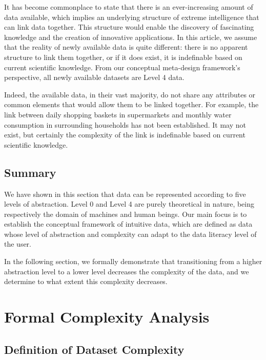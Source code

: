 \documentclass[Afour,times,sageh]{sagej}
\begin{document}
\vspace{1em}

\noindent It has become commonplace to state that there is an ever-increasing amount of data available, which implies an underlying structure of extreme intelligence that can link data together. This structure would enable the discovery of fascinating knowledge and the creation of innovative applications. In this article, we assume that the reality of newly available data is quite different: there is no apparent structure to link them together, or if it does exist, it is indefinable based on current scientific knowledge. From our conceptual meta-design framework's perspective, all newly available datasets are Level 4 data.

Indeed, the available data, in their vast majority, do not share any attributes or common elements that would allow them to be linked together. For example, the link between daily shopping baskets in supermarkets and monthly water consumption in surrounding households has not been established. It may not exist, but certainly the complexity of the link is indefinable based on current scientific knowledge.

\subsection{Summary}

We have shown in this section that data can be represented according to five levels of abstraction. Level 0 and Level 4 are purely theoretical in nature, being respectively the domain of machines and human beings. Our main focus is to establish the conceptual framework of intuitive data, which are defined as data whose level of abstraction and complexity can adapt to the data literacy level of the user.

In the following section, we formally demonstrate that transitioning from a higher abstraction level to a lower level decreases the complexity of the data, and we determine to what extent this complexity decreases.

\section{Formal Complexity Analysis}
\label{sec:complexity}

\subsection{Definition of Dataset Complexity}
\end{document}
